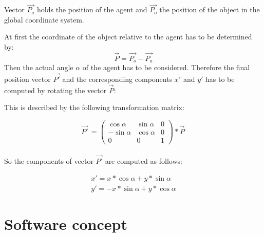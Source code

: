 \documentclass[10pt,a4paper,DIV=11]{scrreprt}
\begin{document}
Vector $\vec{P_a}$ holds the position of the agent and $\vec{P_o}$ the position of the object in the global coordinate system.

At first the coordinate of the object relative to the agent has to be determined by:
\begin{equation}
\vec{P} = \vec{P_o} - \vec{P_a}
\end{equation}
Then the actual angle $\alpha$ of the agent has to be considered. Therefore the final position vector $\vec{P'}$ and the corresponding components $x'$ and $y'$ has to be computed by rotating the vector $\vec{P}$:

This is described by the following transformation matrix: \cite{transform} 

\begin{equation}
\vec{P'}^{\,} =
\begin{pmatrix}
\cos \alpha & \sin \alpha & 0 \\
-\sin \alpha & \cos \alpha & 0 \\
0 & 0 & 1
\end{pmatrix}
* \vec{P}^{\,}
\end{equation} \\

So the components of vector $\vec{P'}$ are computed as follows:

\begin{gather}
x' = x * \cos \alpha + y * \sin \alpha \\
y' = -x * \sin \alpha + y * \cos \alpha \nonumber
\end{gather}










\newpage
\section{Software concept}
\end{document}
